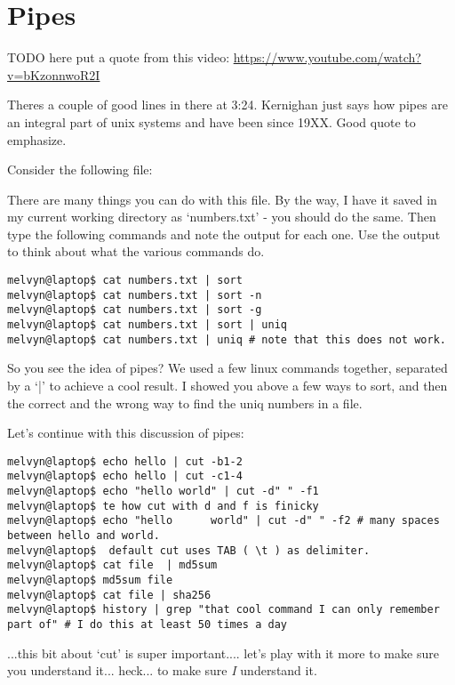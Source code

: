 \documentclass[10pt]{article}
\begin{document}
\section*{Pipes}

TODO 
here put a quote from this video: \url{https://www.youtube.com/watch?v=bKzonnwoR2I}

Theres a couple of good lines in there at 3:24. Kernighan just says how pipes are an integral 
part of unix systems and have been since 19XX. Good quote to emphasize.

Consider the following file:



There are many things you can do with this file. By the way, I have it saved in
my current working directory as `numbers.txt' - you should do the same. Then
type the following commands and note the output for each one. Use the output to
think about what the various commands do.

\begin{lstlisting}[style=term]
melvyn@laptop$ cat numbers.txt | sort
melvyn@laptop$ cat numbers.txt | sort -n
melvyn@laptop$ cat numbers.txt | sort -g
melvyn@laptop$ cat numbers.txt | sort | uniq
melvyn@laptop$ cat numbers.txt | uniq # note that this does not work.
\end{lstlisting}

So you see the idea of pipes? We used a few linux commands together, separated
by a `|' to achieve a cool result. I showed you above a few ways to sort, and
then the correct and the wrong way to find the uniq numbers in a file. 

Let's continue with this discussion of pipes:

\begin{lstlisting}[style=term]
melvyn@laptop$ echo hello | cut -b1-2
melvyn@laptop$ echo hello | cut -c1-4
melvyn@laptop$ echo "hello world" | cut -d" " -f1
melvyn@laptop$ te how cut with d and f is finicky
melvyn@laptop$ echo "hello      world" | cut -d" " -f2 # many spaces between hello and world.
melvyn@laptop$  default cut uses TAB ( \t ) as delimiter.
melvyn@laptop$ cat file  | md5sum
melvyn@laptop$ md5sum file
melvyn@laptop$ cat file | sha256
melvyn@laptop$ history | grep "that cool command I can only remember part of" # I do this at least 50 times a day
\end{lstlisting} 

...this bit about `cut' is super important.... let's play with it more to make
sure you understand it... heck... to make sure \textit{I} understand it.
\end{document}
